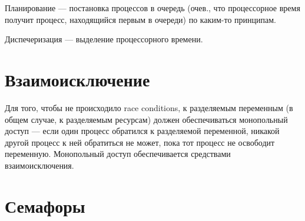 Планирование --- постановка процессов в очередь (очев., что процессорное время получит процесс, находящийся первым в очереди) по каким-то принципам.

Диспечеризация --- выделение процессорного времени.


\section{Взаимоисключение}

Для того, чтобы не происходило race conditions, к разделяемым переменным (в общем случае, к разделяемым ресурсам) должен обеспечиваться монопольный доступ --- если один процесс обратился к разделяемой переменной, никакой другой процесс к ней обратиться не может, пока тот процесс не освободит переменную.
Монопольный доступ обеспечивается средствами взаимоисключения.

\section{Семафоры}
